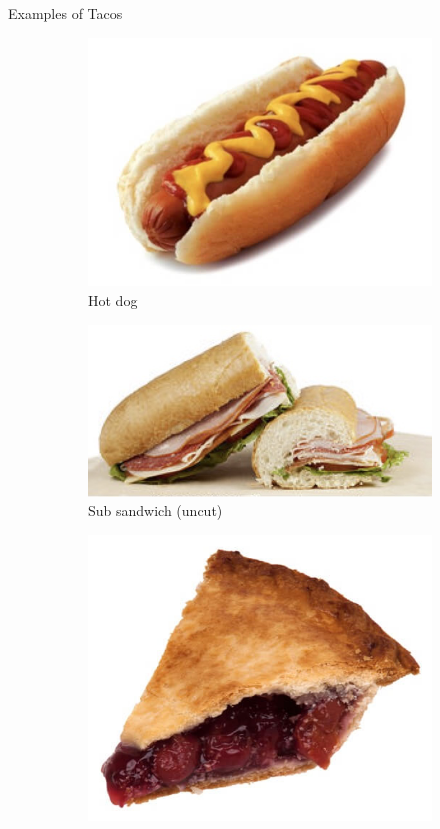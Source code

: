 \documentclass{beamer}
\begin{document}
\begin{frame}{Examples of Tacos}
    \begin{figure}
        \begin{subfigure}{.4\textwidth}
          \centering
          \includegraphics[width=.8\linewidth]{taco/20_hotdog.jpg}
          \caption{\label{fig:hot-dog-taco}Hot dog}
        \end{subfigure}%
        \begin{subfigure}{.4\textwidth}
          \centering
          \includegraphics[width=.8\linewidth]{taco/20_sub.jpg}
          \caption{\label{fig:sub}Sub sandwich (uncut)}
        \end{subfigure}
        \begin{subfigure}{.5\textwidth}
          \centering
          \includegraphics[width=.6\linewidth]{taco/20_pie_slice.jpg}

\end{subfigure}
\end{figure}
\end{frame}
\end{document}

